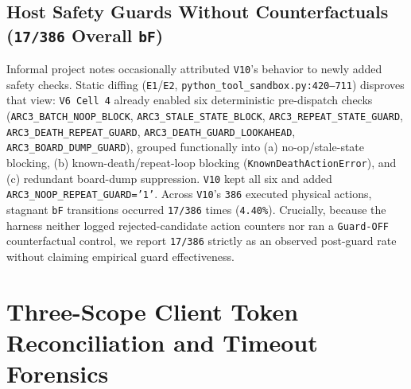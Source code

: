 \documentclass[10pt]{article}
\newcommand{\code}[1]{\texttt{#1}}
\begin{document}
\subsection{Host Safety Guards Without Counterfactuals (\code{17/386} Overall \code{bF})}
Informal project notes occasionally attributed \code{V10}'s behavior to newly added safety checks. Static diffing (\code{E1}/\code{E2}, \code{python\_\allowbreak tool\_\allowbreak sandbox.py:420--711}) disproves that view: \code{V6 Cell 4} already enabled six deterministic pre-dispatch checks (\code{ARC3\_BATCH\_\allowbreak NOOP\_BLOCK}, \code{ARC3\_STALE\_\allowbreak STATE\_BLOCK}, \code{ARC3\_REPEAT\_\allowbreak STATE\_GUARD}, \code{ARC3\_DEATH\_\allowbreak REPEAT\_GUARD}, \code{ARC3\_DEATH\_\allowbreak GUARD\_\allowbreak LOOKAHEAD}, \code{ARC3\_BOARD\_\allowbreak DUMP\_GUARD}), grouped functionally into (a) no-op/stale-state blocking, (b) known-death/repeat-loop blocking (\code{KnownDeathActionError}), and (c) redundant board-dump suppression. \code{V10} kept all six and added \code{ARC3\_NOOP\_\allowbreak REPEAT\_GUARD='1'}. Across \code{V10}'s \code{386} executed physical actions, stagnant \code{bF} transitions occurred \code{17/386} times (\code{4.40\%}). Crucially, because the harness neither logged rejected-candidate action counters nor ran a \code{Guard-OFF} counterfactual control, we report \code{17/386} strictly as an observed post-guard rate without claiming empirical guard effectiveness.

\section{Three-Scope Client Token Reconciliation and Timeout Forensics}
\label{sec:accounting}
\end{document}
